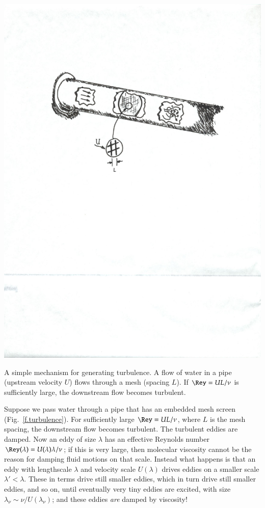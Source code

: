 \begin{marginfigure}
\includegraphics[width=\textwidth]{turbulence-maker}
\caption[A simple mechanism for generating turbulence.]{\label{f.turbulence} A simple mechanism for generating turbulence. A flow of water in a pipe (upstream velocity $U$) flows through a mesh (spacing $L$).  If $\Rey = UL/\nu$ is sufficiently large, the downstream flow becomes turbulent. }
\end{marginfigure}

Suppose we pass water through a pipe that has an embedded mesh screen (Fig.~\ref{f.turbulence}).  For sufficiently large $\Rey = UL/\nu$, where $L$ is the mesh spacing, the downstream flow becomes turbulent. The turbulent eddies are damped.  Now an eddy of size $\lambda$ has an effective Reynolds number $\Rey(\lambda) = U(\lambda)\lambda/\nu$; if this is very large, then molecular viscosity cannot be the reason for damping fluid motions on that scale. Instead what happens is that an eddy with lengthscale $\lambda$ and velocity scale $U(\lambda)$ drives eddies on a smaller scale $\lambda' < \lambda$. These in terms drive still smaller eddies, which in turn drive still smaller eddies, and so on, until eventually very tiny eddies are excited, with size $\lambda_{\nu} \sim \nu/U(\lambda_{\nu})$; and these eddies \emph{are} damped by viscosity!

